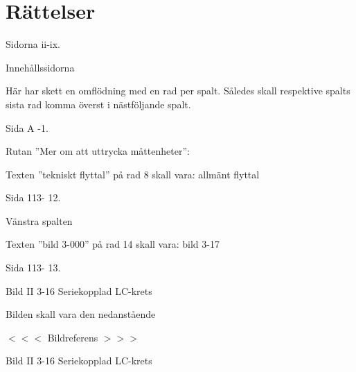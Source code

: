 \section{Rättelser}

Sidorna ii-ix.

Innehållssidorna

Här har skett en omflödning med en rad per spalt.  Således skall
respektive spalts sista rad komma överst i nästföljande spalt.

Sida A -1.

Rutan ''Mer om att uttrycka måttenheter'':

Texten ''tekniskt flyttal'' på rad 8 skall vara: allmänt flyttal

Sida 113- 12.

Vänstra spalten

Texten ''bild 3-000'' på rad 14 skall vara: bild 3-17

Sida 113- 13.

Bild II 3-16 Seriekopplad LC-krets

Bilden skall vara den nedanstående

$<<<$ Bildreferens $>>>$

Bild II 3-16 Seriekopplad LC-krets
